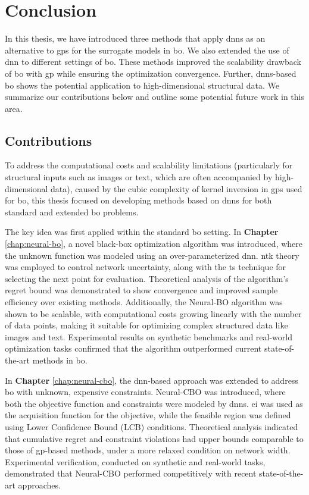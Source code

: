 \chapter{Conclusion} %

\label{chap:conclusion} %

In this thesis, we have introduced three methods that apply \acp{dnn} as an alternative to \acp{gp} for the surrogate models in \ac{bo}. We also extended the use of \ac{dnn} to different settings of \ac{bo}. These methods improved the scalability drawback of \ac{bo} with \ac{gp} while ensuring the optimization convergence. Further, \acp{dnn}-based \acl{bo} shows the potential application to high-dimensional structural data. We summarize our
contributions below and outline some potential future work in this area. 

\section{Contributions}
To address the computational costs and scalability limitations (particularly for structural inputs such as images or text, which are often accompanied by high-dimensional data), caused by the cubic complexity of kernel inversion in \acp{gp} used for \ac{bo}, this thesis focused on developing methods based on \acp{dnn} for both standard and extended \ac{bo} problems.

The key idea was first applied within the standard \ac{bo} setting. In \textbf{Chapter} \ref{chap:neural-bo}, a novel black-box optimization algorithm was introduced, where the unknown function was modeled using an over-parameterized \ac{dnn}. \ac{ntk} theory was employed to control network uncertainty, along with the \ac{ts} technique for selecting the next point for evaluation. Theoretical analysis of the algorithm's regret bound was demonstrated to show convergence and improved sample efficiency over existing methods. Additionally, the Neural-BO algorithm was shown to be scalable, with computational costs growing linearly with the number of data points, making it suitable for optimizing complex structured data like images and text. Experimental results on synthetic benchmarks and real-world optimization tasks confirmed that the algorithm outperformed current state-of-the-art methods in \ac{bo}. 

In \textbf{Chapter} \ref{chap:neural-cbo}, the \ac{dnn}-based approach was extended to address \ac{bo} with unknown, expensive constraints. Neural-CBO was introduced, where both the objective function and constraints were modeled by \acp{dnn}. \ac{ei} was used as the acquisition function for the objective, while the feasible region was defined using Lower Confidence Bound (LCB) conditions. Theoretical analysis indicated that cumulative regret and constraint violations had upper bounds comparable to those of \ac{gp}-based methods, under a more relaxed condition on network width. Experimental verification, conducted on synthetic and real-world tasks, demonstrated that Neural-CBO performed competitively with recent state-of-the-art approaches. 

